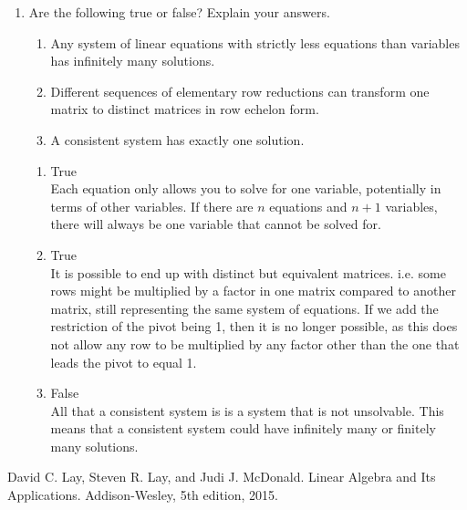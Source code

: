 \documentclass[12pt,a4paper]{exam}
\begin{document}
\begin{enumerate}
\begin{solution}
\begin{itemize}
    \end{itemize}
\end{solution}

\item
 Are the following true or false? Explain your answers.

\begin{enumerate}
\item
 Any system of linear equations with strictly less equations than variables has infinitely many solutions.

\item
 Different sequences of elementary row reductions can transform one matrix to distinct matrices in
 row echelon form.

\item
 A consistent system has exactly one solution.

\end{enumerate}

\begin{solution}
    \begin{enumerate}
        \item True\\
            Each equation only allows you to solve for one variable, potentially in terms of other variables. If there are $n$ equations and $n+1$ variables, there will always be one variable that cannot be solved for.
        \item True\\
            It is possible to end up with distinct but equivalent matrices. i.e. some rows might be multiplied by a factor in one matrix compared to another matrix, still representing the same system of equations. If we add the restriction of the pivot being 1, then it is no longer possible, as this does not allow any row to be multiplied by any factor other than the one that leads the pivot to equal 1.
        \item False\\
            All that a consistent system is is a system that is not unsolvable. This means that a consistent system could have infinitely many or finitely many  solutions.
    \end{enumerate}
\end{solution}

\end{enumerate}


\begin{thebibliography}{1}
 David C. Lay, Steven R. Lay, and Judi J. McDonald.
\newblock Linear Algebra and Its Applications.
\newblock Addison-Wesley, 5th edition, 2015.
\end{thebibliography}
\end{document}
